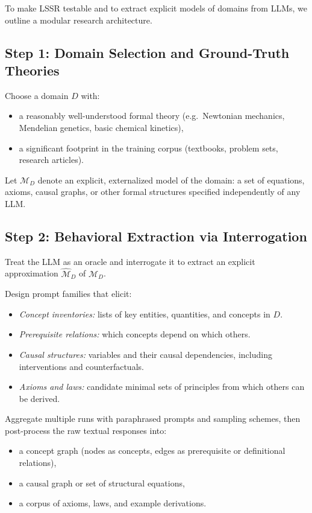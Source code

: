 \documentclass[11pt]{article}
\begin{document}
	To make LSSR testable and to extract explicit models of domains from LLMs, we outline a modular research architecture.
	
	\subsection{Step 1: Domain Selection and Ground-Truth Theories}
	
	Choose a domain $D$ with:
	\begin{itemize}[nosep]
		\item a reasonably well-understood formal theory (e.g.\ Newtonian mechanics, Mendelian genetics, basic chemical kinetics),
		\item a significant footprint in the training corpus (textbooks, problem sets, research articles).
	\end{itemize}
	
	Let $\mathcal{M}_D$ denote an explicit, externalized model of the domain: a set of equations, axioms, causal graphs, or other formal structures specified independently of any LLM.
	
	\subsection{Step 2: Behavioral Extraction via Interrogation}
	
	Treat the LLM as an oracle and interrogate it to extract an explicit approximation $\hat{\mathcal{M}}_D$ of $\mathcal{M}_D$.
	
	Design prompt families that elicit:
	\begin{itemize}[nosep]
		\item \emph{Concept inventories:} lists of key entities, quantities, and concepts in $D$.
		\item \emph{Prerequisite relations:} which concepts depend on which others.
		\item \emph{Causal structures:} variables and their causal dependencies, including interventions and counterfactuals.
		\item \emph{Axioms and laws:} candidate minimal sets of principles from which others can be derived.
	\end{itemize}
	
	Aggregate multiple runs with paraphrased prompts and sampling schemes, then post-process the raw textual responses into:
	\begin{itemize}[nosep]
		\item a concept graph (nodes as concepts, edges as prerequisite or definitional relations),
		\item a causal graph or set of structural equations,
		\item a corpus of axioms, laws, and example derivations.
	\end{itemize}
	
\end{document}
